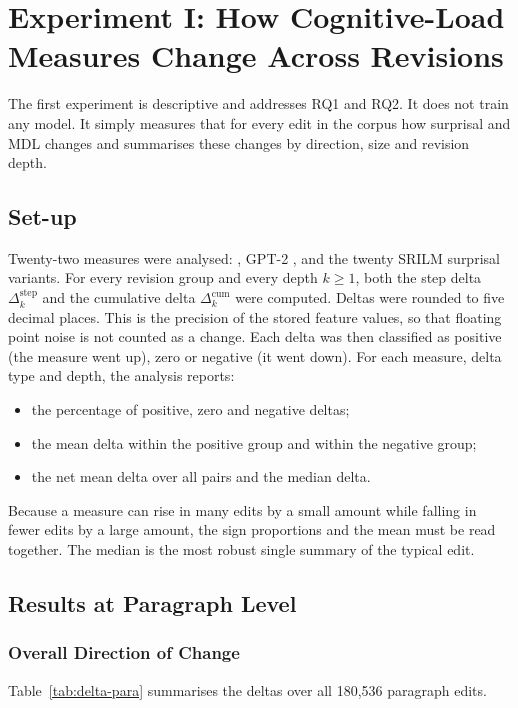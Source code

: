 \documentclass[12pt,a4paper,oneside]{report}
\newcommand{\feat}[1]{\texttt{\detokenize{#1}}}
\begin{document}
\chapter{Experiment I: How Cognitive-Load Measures Change Across Revisions}
\label{ch:exp1}

The first experiment is descriptive and addresses RQ1 and RQ2. It does not train any model. It simply measures that for every edit in the corpus how surprisal and MDL changes and summarises these changes by direction, size and revision depth.

\section{Set-up}
Twenty-two measures were analysed: \feat{mean_mdl}, GPT-2 \feat{mean_surprisal}, and the twenty SRILM surprisal variants. For every revision group and every depth $k \ge 1$, both the step delta $\Delta^{\text{step}}_k$ and the cumulative delta $\Delta^{\text{cum}}_k$ were computed. Deltas were rounded to five decimal places. This is the precision of the stored feature values, so that floating point noise is not counted as a change. Each delta was then classified as positive (the measure went up), zero or negative (it went down). For each measure, delta type and depth, the analysis reports:
\begin{itemize}
  \item the percentage of positive, zero and negative deltas;
  \item the mean delta within the positive group and within the negative group;
  \item the net mean delta over all pairs and the median delta.
\end{itemize}
Because a measure can rise in many edits by a small amount while falling in fewer edits by a large amount, the sign proportions and the mean must be read together. The median is the most robust single summary of the typical edit.

\section{Results at Paragraph Level}
\subsection{Overall Direction of Change}
Table~\ref{tab:delta-para} summarises the deltas over all 180{,}536 paragraph edits.
\end{document}
